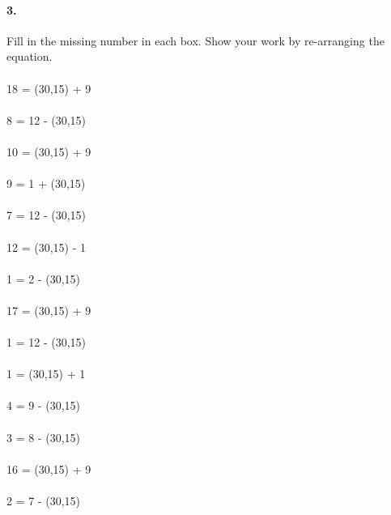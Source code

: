 \documentclass[12pt]{article}
\begin{document}
\paragraph{3.}
Fill in the missing number in each box. Show your work by re-arranging the equation. \\
\\
18 = \framebox(30,15){} + 9
\\
\\
8 = 12 - \framebox(30,15){}
\\
\\
10 = \framebox(30,15){} + 9
\\
\\
9 = 1 + \framebox(30,15){}
\\
\\
7 = 12 - \framebox(30,15){}
\\
\\
12 = \framebox(30,15){} - 1
\\
\\
1 = 2 - \framebox(30,15){}
\\
\\
17 = \framebox(30,15){} + 9
\\
\\
1 = 12 - \framebox(30,15){}
\\
\\
1 = \framebox(30,15){} + 1
\\
\\
4 = 9 - \framebox(30,15){}
\\
\\
3 = 8 - \framebox(30,15){}
\\
\\
16 = \framebox(30,15){} + 9
\\
\\
2 = 7 - \framebox(30,15){}
\\
\\
\end{document}
